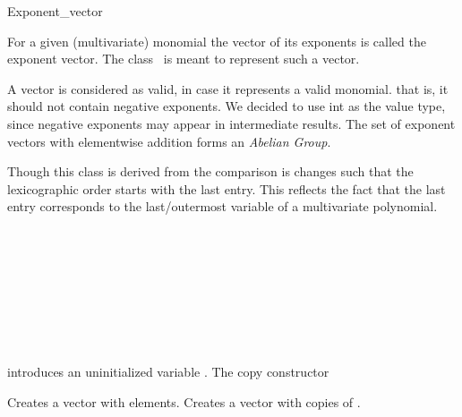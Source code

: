 \begin{ccRefClass}{Exponent_vector}

\ccDefinition

For a given (multivariate) monomial the vector of its exponents is called the 
exponent vector. The class \ccClassName\ is meant to represent 
such a vector.

A vector is considered as valid, in case it represents a valid monomial. 
that is, it should not contain negative exponents. 
We decided to use int as the value type, 
since negative exponents may appear in intermediate results.
The set of exponent vectors with elementwise 
addition forms an {\em Abelian Group}. 

Though this class is derived from  the comparison
is changes such that the lexicographic order starts with the last entry. 
This reflects the fact that the last entry corresponds 
to the last/outermost variable of a multivariate polynomial. 




\ccInheritsFrom
{}

\ccIsModel

\\
\\

\\
\\
\\

\\
\\

\ccCreation
{}

        {introduces an uninitialized variable \ccVar.
        }\ccGlue
        {The copy constructor
        }\ccGlue

        {Creates a vector with  elements.
        }\ccGlue
{} 
        {Creates a vector with  copies of . 
        }\ccGlue


\end{ccRefClass}
